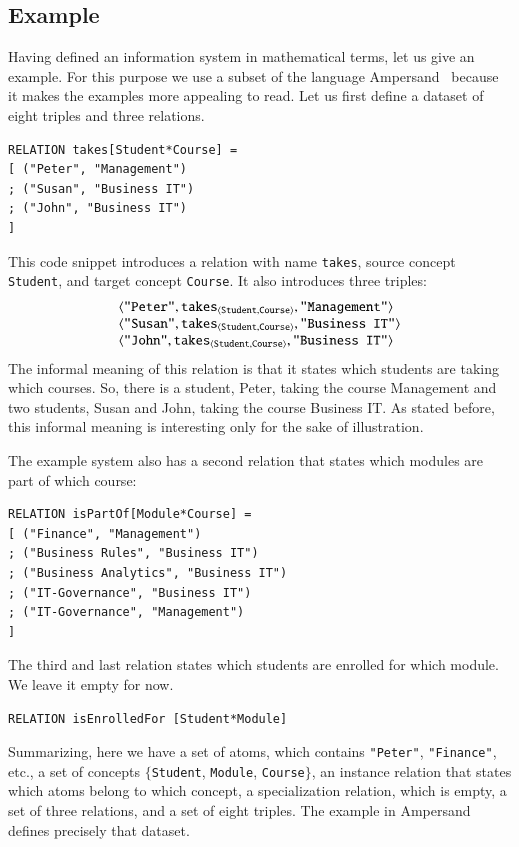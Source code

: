 \documentclass{elsarticle}
\begin{document}
\subsection{Example}
	Having defined an information system in mathematical terms, let us give an example.
	For this purpose we use a subset of the language Ampersand~\cite{Joosten-JLAMP2018}
	because it makes the examples more appealing to read.
	Let us first define a dataset of eight triples and three relations.
\begin{verbatim}
RELATION takes[Student*Course] =
[ ("Peter", "Management")
; ("Susan", "Business IT")
; ("John", "Business IT")
]
\end{verbatim}
	This code snippet introduces a relation with name \verb#takes#,
	source concept \verb#Student#, and
	target concept \verb#Course#.
	It also introduces three triples:
\[\begin{array}{l}
	\langle{\text{\tt "Peter"}},{\text{\it \text{\tt takes}\/}_{\langle{\text{\tt Student}},{\text{\tt Course}}\rangle}},{\text{\tt "Management"}}\rangle\\
	\langle{\text{\tt "Susan"}},{\text{\it \text{\tt takes}\/}_{\langle{\text{\tt Student}},{\text{\tt Course}}\rangle}},{\text{\tt "Business IT"}}\rangle\\
	\langle{\text{\tt "John"}},{\text{\it \text{\tt takes}\/}_{\langle{\text{\tt Student}},{\text{\tt Course}}\rangle}},{\text{\tt "Business IT"}}\rangle\\
\end{array}\]
	The informal meaning of this relation is that it states which students are taking which courses.
	So, there is a student, Peter, taking the course Management and two students, Susan and John, taking the course Business IT.
	As stated before, this informal meaning is interesting only for the sake of illustration.

	The example system also has a second relation that states which modules are part of which course:

\begin{verbatim}
RELATION isPartOf[Module*Course] =
[ ("Finance", "Management")
; ("Business Rules", "Business IT")
; ("Business Analytics", "Business IT")
; ("IT-Governance", "Business IT")
; ("IT-Governance", "Management")
]
\end{verbatim}
	The third and last relation states which students are enrolled for which module.
	We leave it empty for now.
\begin{verbatim}
RELATION isEnrolledFor [Student*Module]
\end{verbatim}
	Summarizing, here we have a set of atoms, which contains \verb-"Peter"-, \verb-"Finance"-, etc.,
	a set of concepts $\{$\verb-Student-, \verb-Module-, \verb-Course-$\}$,
	an instance relation that states which atoms belong to which concept,
	a specialization relation, which is empty,
	a set of three relations, and
	a set of eight triples.
	The example in Ampersand defines precisely that dataset.
	
\end{document}
